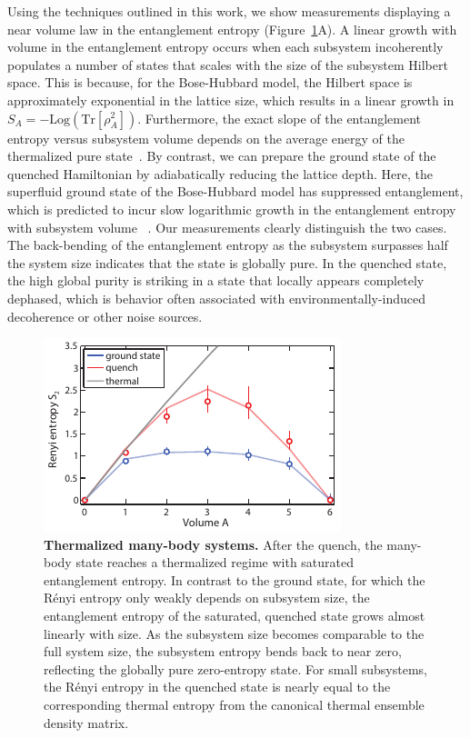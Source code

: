 Using the techniques outlined in this work, we show measurements displaying a near volume law in the entanglement entropy (Figure~\ref{fig:volume}A). A linear growth with volume in the entanglement entropy occurs when each subsystem incoherently populates a number of states that scales with the size of the subsystem Hilbert space. This is because, for the Bose-Hubbard model, the Hilbert space is approximately exponential in the lattice size, which results in a linear growth in $S_A = -\textrm{Log}(\textrm{Tr}[\rho_{A}^2])$. Furthermore, the exact slope of the entanglement entropy versus subsystem volume depends on the average energy of the thermalized pure state~\cite{Grover2015}.  By contrast, we can prepare the ground state of the quenched Hamiltonian by adiabatically reducing the lattice depth. Here, the superfluid ground state of the Bose-Hubbard model has suppressed entanglement, which is predicted to incur slow logarithmic growth in the entanglement entropy with subsystem volume~\cite{CardyGS} . Our measurements clearly distinguish the two cases. The back-bending of the entanglement entropy as the subsystem surpasses half the system size indicates that the state is globally pure. In the quenched state, the high global purity is striking in a state that locally appears completely dephased, which is behavior often associated with environmentally-induced decoherence or other noise sources. 

\begin{figure}
	\centering
	\includegraphics[scale=1.5]{figures/ETH_volumeLaw.pdf}
	\caption{{\bf Thermalized many-body systems.} After the quench, the many-body state reaches a thermalized regime with saturated entanglement entropy. In contrast to the ground state, for which the R\'{e}nyi entropy only weakly depends on subsystem size, the entanglement entropy of the saturated, quenched state grows almost linearly with size. As the subsystem size becomes comparable to the full system size, the subsystem entropy bends back to near zero, reflecting the globally pure zero-entropy state. For small subsystems, the R\'{e}nyi entropy in the quenched state is nearly equal to the corresponding thermal entropy from the canonical thermal ensemble density matrix.}
	\label{fig:volume}
\end{figure}

